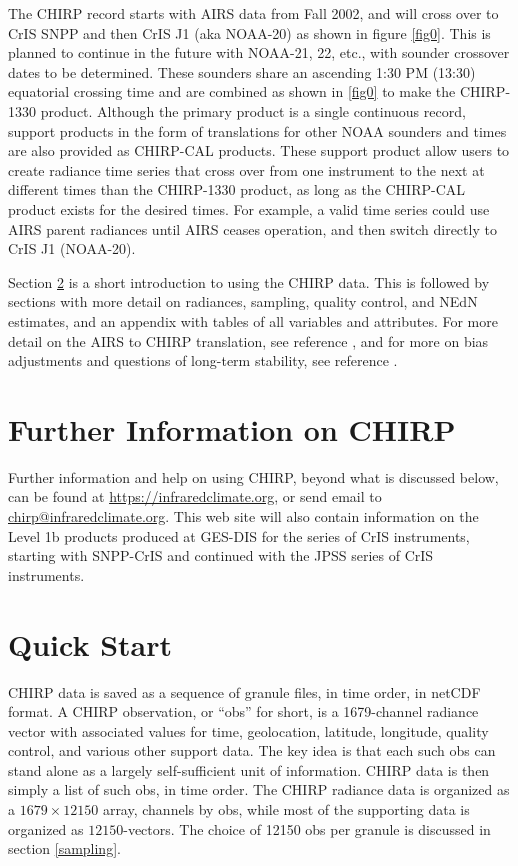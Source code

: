 \documentclass[11pt]{article}
\begin{document}
The CHIRP record starts with AIRS data from Fall 2002, and will cross over
to CrIS SNPP and then CrIS J1 (aka NOAA-20) as shown in figure \ref{fig0}.
This is planned to continue in the future with NOAA-21, 22, etc., with
sounder crossover dates to be determined.  These sounders share an
ascending 1:30 PM (13:30) equatorial crossing time and are combined as
shown in \ref{fig0} to make the CHIRP-1330 product.  Although the primary
product is a single continuous record, support products in the form of
translations for other NOAA sounders and times are also provided as
CHIRP-CAL products.  These support product allow users to create radiance
time series that cross over from one instrument to the next at different
times than the CHIRP-1330 product, as long as the CHIRP-CAL product exists
for the desired times.  For example, a valid time series could use AIRS
parent radiances until AIRS ceases operation, and then switch directly to
CrIS J1 (NOAA-20).

Section \ref{format} is a short introduction to using the CHIRP data.
This is followed by sections with more detail on radiances, sampling,
quality control, and NEdN estimates, and an appendix with tables of
all variables and attributes.  For more detail on the AIRS to CHIRP
translation, see reference \cite{mott2018}, and for more on bias
adjustments and questions of long-term stability, see reference
\cite{strow2021a}.

\section{Further Information on CHIRP}
Further information and help on using CHIRP, beyond what is discussed
below, can be found at
\href{https://infraredclimate.org}{https://infraredclimate.org}, or send
email to
\href{mailto:chirp@infraredclimate.org}{chirp@infraredclimate.org}.  This
web site will also contain information on the Level 1b products produced at
GES-DIS for the series of CrIS instruments, starting with SNPP-CrIS and
continued with the JPSS series of CrIS instruments.

\section{Quick Start}
\label{format}

CHIRP data is saved as a sequence of granule files, in time order,
in netCDF format.  A CHIRP observation, or ``obs'' for short, is a
1679-channel radiance vector with associated values for time,
geolocation, latitude, longitude, quality control, and various other
support data.  The key idea is that each such obs can stand alone as
a largely self-sufficient unit of information.  CHIRP data is then
simply a list of such obs, in time order.  The CHIRP radiance data
is organized as a $1679 \times 12150$ array, channels by obs, while
most of the supporting data is organized as $12150$-vectors.  The
choice of 12150 obs per granule is discussed in section
\ref{sampling}.
\end{document}
